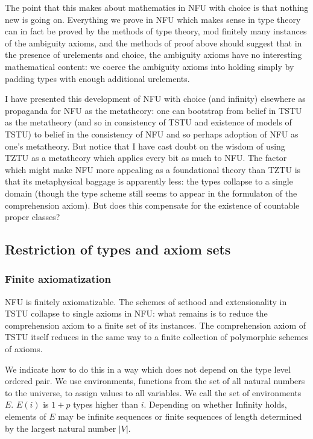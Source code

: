 \documentclass[12pt]{article}
\begin{document}
The point that this makes about mathematics in NFU with choice  is that nothing new is going on.  Everything we prove in NFU which makes sense in type theory can in fact be proved by the methods of type theory, mod finitely many instances of the ambiguity axioms, and the methods of proof above should suggest that in the presence of urelements and choice, the ambiguity axioms have no interesting mathematical content:  we coerce the ambiguity axioms into holding simply by padding types with enough additional urelements.

I have presented this development of NFU with choice (and infinity) elsewhere as propaganda for NFU as the metatheory:  one can bootstrap from belief in TSTU as the metatheory (and so in consistency of TSTU and existence of models of TSTU) to belief in the consistency of NFU and so perhaps adoption of NFU as one's metatheory.  But notice that I have cast doubt on the wisdom of using TZTU as a metatheory which applies every bit as much to NFU.  The factor which might make NFU more appealing as a foundational theory than TZTU is that its metaphysical baggage is apparently less:  the types collapse to a single domain (though the type scheme still seems to appear in the formulaton of the comprehension axiom).  But does this compensate for the existence of countable proper classes?

\subsection{Restriction of types and axiom sets}

\subsubsection{Finite axiomatization}

NFU is finitely axiomatizable.  The schemes of sethood and extensionality in TSTU collapse to single axioms in NFU:  what remains is to reduce the comprehension axiom to a finite set of its instances.
The comprehension axiom of TSTU itself reduces in the same way to a finite collection of polymorphic schemes of axioms.

We indicate how to do this in a way which does not depend on the type level ordered pair.   We use environments, functions from the set of all natural numbers to the universe, to assign values to all variables.  We call the set of environments $E$.  $E(i)$ is $1+p$ types higher than $i$.  Depending on whether Infinity holds, elements of $E$ may be infinite sequences or finite sequences of length determined by the largest natural number $|V|$.
\end{document}
